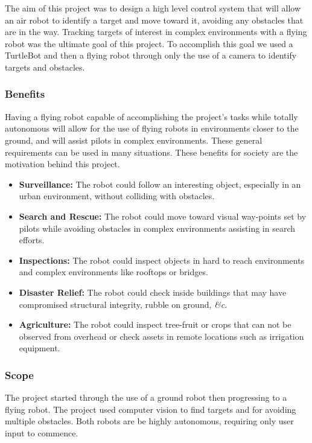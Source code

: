 \documentclass{article}
\begin{document}
	The aim of this project was to design a high level control system that will allow an air robot to identify a target and move toward it, avoiding any obstacles that are in the way. Tracking targets of interest in complex environments with a flying robot was the ultimate goal of this project. To accomplish this goal we used a TurtleBot and then a flying robot through only the use of a camera to identify targets and obstacles. 
		
		\subsubsection{Benefits}
		
		Having a flying robot capable of accomplishing the project's tasks while totally autonomous will allow for the use of flying robots in environments closer to the ground, and will assist pilots in complex environments. These general requirements can be used in many situations. These benefits for society are the motivation behind this project.
		
		\begin{itemize}
			\item \textbf{Surveillance:} The robot could follow an interesting object, especially in an urban environment, without colliding with obstacles.
			\item \textbf{Search and Rescue:} The robot could move toward visual way-points set by pilots while avoiding obstacles in complex environments assisting in search efforts.
			\item \textbf{Inspections:} The robot could inspect objects in hard to reach environments and complex environments like rooftops or bridges.
			\item \textbf{Disaster Relief:} The robot could check inside buildings that may have compromised structural integrity, rubble on ground, \textit{\&c}.
			\item \textbf{Agriculture:} The robot could inspect tree-fruit or crops that can not be observed from overhead or check assets in remote locations such as irrigation equipment.
		\end{itemize}

		\subsubsection{Scope}
	
	The project started through the use of a ground robot then progressing to a flying robot. The project used computer vision to find targets and for avoiding multiple obstacles. Both robots are be highly autonomous, requiring only user input to commence. 
\end{document}
